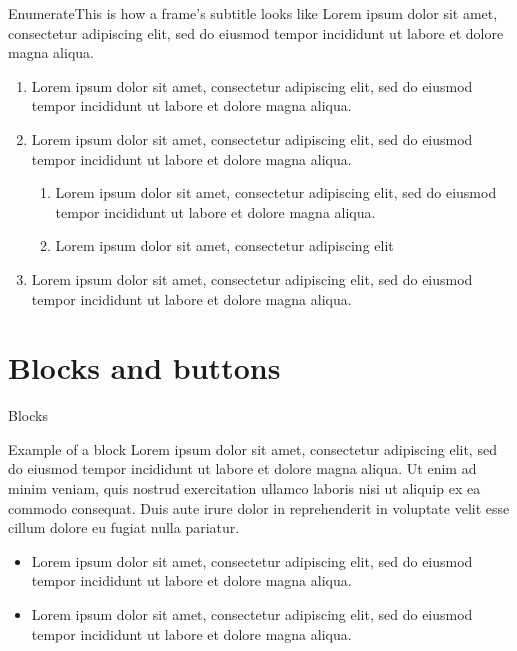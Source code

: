 \documentclass[10pt,numbering,toc,wide]{bpslides}
\begin{document}
\begin{frame}{Enumerate}{This is how a frame's subtitle looks like}
Lorem ipsum dolor sit amet, consectetur adipiscing elit, sed do eiusmod tempor incididunt ut labore et dolore magna aliqua. 
\begin{enumerate}
\item Lorem ipsum dolor sit amet, consectetur adipiscing elit, sed do eiusmod tempor incididunt ut labore et dolore magna aliqua.
\item Lorem ipsum dolor sit amet, consectetur adipiscing elit, sed do eiusmod tempor incididunt ut labore et dolore magna aliqua. 
\begin{enumerate}
\item Lorem ipsum dolor sit amet, consectetur adipiscing elit, sed do eiusmod tempor incididunt ut labore et dolore magna aliqua. 
\item Lorem ipsum dolor sit amet, consectetur adipiscing elit
\end{enumerate}
\item Lorem ipsum dolor sit amet, consectetur adipiscing elit, sed do eiusmod tempor incididunt ut labore et dolore magna aliqua. 
\end{enumerate}
\end{frame}

\section{Blocks and buttons}

\begin{frame}{Blocks}
\begin{block}{Example of a block}
Lorem ipsum dolor sit amet, consectetur adipiscing elit, sed do eiusmod tempor incididunt ut labore et dolore magna aliqua. Ut enim ad minim veniam, quis nostrud exercitation ullamco laboris nisi ut aliquip ex ea commodo consequat. Duis aute irure dolor in reprehenderit in voluptate velit esse cillum dolore eu fugiat nulla pariatur.
\end{block}
\begin{itemize}
\item Lorem ipsum dolor sit amet, consectetur adipiscing elit, sed do eiusmod tempor incididunt ut labore et dolore magna aliqua.
\item Lorem ipsum dolor sit amet, consectetur adipiscing elit, sed do eiusmod tempor incididunt ut labore et dolore magna aliqua.
\end{itemize}
\end{frame}
\end{document}
